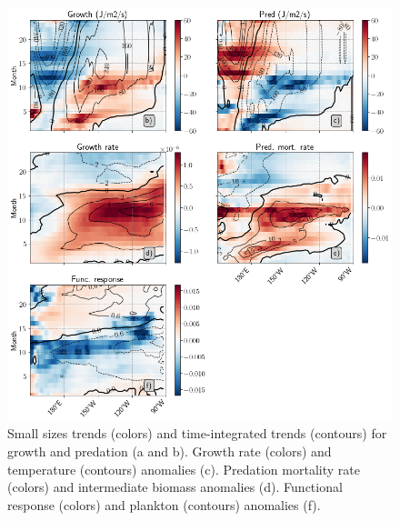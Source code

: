 \begin{figure}[h!tp]
	\centering
	\includegraphics[scale=0.4]{figs/fig8.png}	
	\caption{Small sizes trends (colors) and time-integrated trends (contours) for growth and predation (a and b). Growth rate (colors) and temperature (contours) anomalies (c). Predation mortality rate (colors) and intermediate biomass anomalies (d). Functional response (colors) and plankton (contours) anomalies (f).}
	\label{fig:fig8}
\end{figure}

